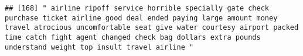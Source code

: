 \documentclass[
]{article}
\begin{document}
\begin{verbatim}
## [168] " airline ripoff service horrible specially gate check purchase ticket airline good deal ended paying large amount money travel atrocious uncomfortable seat give water courtesy airport packed time catch fight agent changed check bag dollars extra pounds understand weight top insult travel airline "                                                                                                                                                                                                                                                                                                                                                                                                                                                                                                                                                                                                                                                                                                                                                                                                                                                                                                                                                                                                                                                                                                                                                                                                                                                                                                                                                                                                                                                                                     

\end{verbatim}
\end{document}
